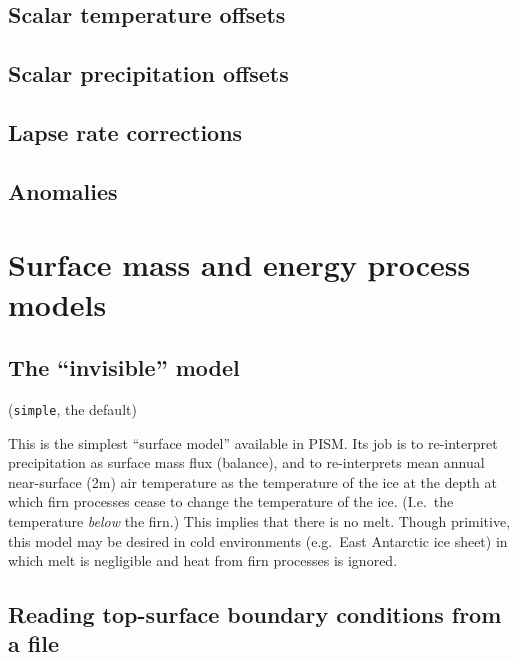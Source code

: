 \documentclass[titlepage,letterpaper,final]{scrartcl}
\def\optsection#1{%
  \def\optindex##1{\index[options]{#1!##1}}
  \def\optseealso##1{\index[options]{#1|see{##1}}}
}
\begin{document}
\subsection{Scalar temperature offsets}
\label{sec:atmosphere-delta-temp}

\subsection{Scalar precipitation offsets}
\label{sec:atmosphere-delta-precip}

\subsection{Lapse rate corrections}
\label{sec:atmosphere-lapse-rates}

\subsection{Anomalies}
\label{sec:atmosphere-anomalies}



\section{Surface mass and energy process models}
\label{sec:surface}
\optsection{Climate (boundary) models!\texttt{-surface} [simple, constant, elevation, given, pdd, forcing]}

\subsection{The ``invisible'' model}
\label{sec:surface-simple}

(\texttt{simple}, the default)

This is the simplest ``surface model'' available in PISM. Its job is to
re-interpret precipitation as surface mass flux (balance), and to re-interprets
mean annual near-surface (2m) air temperature as the temperature of the ice at
the depth at which firn processes cease to change the temperature of the ice.
(I.e.~the temperature \emph{below} the firn.) This implies that there is no
melt. Though primitive, this model may be desired in cold environments
(e.g.~East Antarctic ice sheet) in which melt is negligible and heat from firn
processes is ignored.

\subsection{Reading top-surface boundary conditions from a file}
\label{sec:surface-given}
\end{document}
